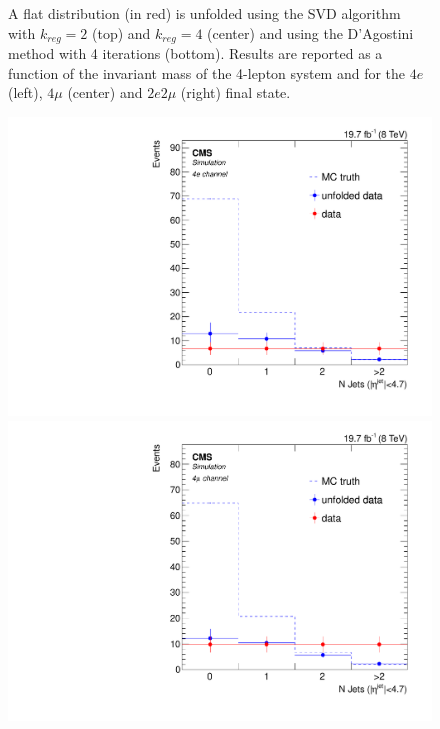 \begin{figure}[hbtp]
\begin{center}
    \caption{A flat distribution (in red) is unfolded using the SVD algorithm with $k_{reg} = 2$ (top) and $k_{reg} = 4$ (center) and using the D'Agostini method with 4 iterations (bottom). Results are reported as a function of the invariant mass of the 4-lepton system  and for the $4e$ (left), $4\mu$ (center) and $2e2\mu$ (right) final state.}
   \label{fig:Mass_biased}
 \end{center}
\end{figure}

\begin{figure}[hbtp]
  \begin{center}
    \includegraphics[width=0.8\cmsFigWidth]{Figures/Unfolding/MCTests/Biased_Distributions/Jets_ZZTo4e_Mad_fr_SVD_2}     
    \includegraphics[width=0.8\cmsFigWidth]{Figures/Unfolding/MCTests/Biased_Distributions/Jets_ZZTo4m_Mad_fr_SVD_2}     

\end{center}
\end{figure}
